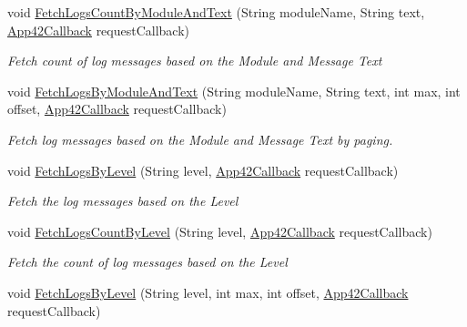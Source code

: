 \begin{DoxyCompactItemize}
void \hyperlink{classcom_1_1shephertz_1_1app42_1_1paas_1_1sdk_1_1windows_1_1log_1_1_log_service_a7bb7ecbf5207309b69664b7595245d76}{Fetch\+Logs\+Count\+By\+Module\+And\+Text} (String module\+Name, String text, \hyperlink{interfacecom_1_1shephertz_1_1app42_1_1paas_1_1sdk_1_1windows_1_1_app42_callback}{App42\+Callback} request\+Callback)
\begin{DoxyCompactList}\small\item\em Fetch count of log messages based on the Module and Message Text \end{DoxyCompactList}\item 
void \hyperlink{classcom_1_1shephertz_1_1app42_1_1paas_1_1sdk_1_1windows_1_1log_1_1_log_service_ae55808676c1323db83ea7bfcff2ecc01}{Fetch\+Logs\+By\+Module\+And\+Text} (String module\+Name, String text, int max, int offset, \hyperlink{interfacecom_1_1shephertz_1_1app42_1_1paas_1_1sdk_1_1windows_1_1_app42_callback}{App42\+Callback} request\+Callback)
\begin{DoxyCompactList}\small\item\em Fetch log messages based on the Module and Message Text by paging. \end{DoxyCompactList}\item 
void \hyperlink{classcom_1_1shephertz_1_1app42_1_1paas_1_1sdk_1_1windows_1_1log_1_1_log_service_a0b9e4df3ad61087e41f883818cb678d8}{Fetch\+Logs\+By\+Level} (String level, \hyperlink{interfacecom_1_1shephertz_1_1app42_1_1paas_1_1sdk_1_1windows_1_1_app42_callback}{App42\+Callback} request\+Callback)
\begin{DoxyCompactList}\small\item\em Fetch the log messages based on the Level \end{DoxyCompactList}\item 
void \hyperlink{classcom_1_1shephertz_1_1app42_1_1paas_1_1sdk_1_1windows_1_1log_1_1_log_service_a4d5ed4d0ba1be5434af15497cae19f64}{Fetch\+Logs\+Count\+By\+Level} (String level, \hyperlink{interfacecom_1_1shephertz_1_1app42_1_1paas_1_1sdk_1_1windows_1_1_app42_callback}{App42\+Callback} request\+Callback)
\begin{DoxyCompactList}\small\item\em Fetch the count of log messages based on the Level \end{DoxyCompactList}\item 
void \hyperlink{classcom_1_1shephertz_1_1app42_1_1paas_1_1sdk_1_1windows_1_1log_1_1_log_service_a8ce400e503d744c061cbbd6c6669a323}{Fetch\+Logs\+By\+Level} (String level, int max, int offset, \hyperlink{interfacecom_1_1shephertz_1_1app42_1_1paas_1_1sdk_1_1windows_1_1_app42_callback}{App42\+Callback} request\+Callback)

\end{DoxyCompactItemize}
